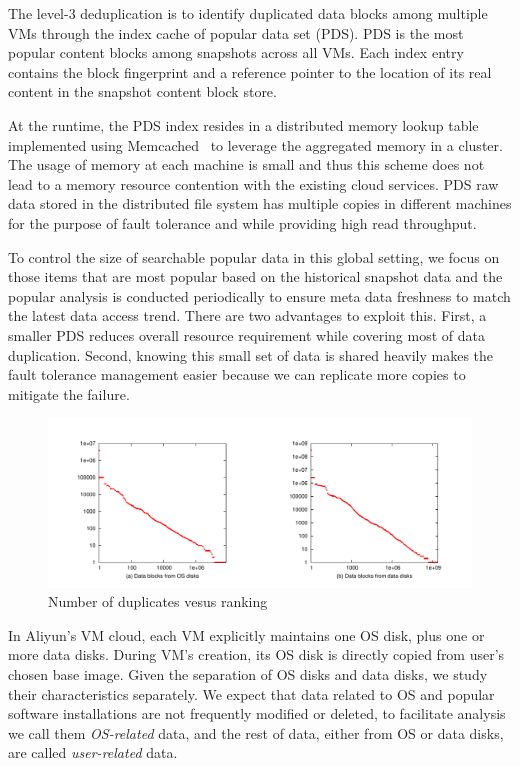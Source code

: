 The level-3 deduplication is to identify duplicated data blocks among multiple VMs through the index cache
of popular data set (PDS).  PDS is the most popular content blocks 
among snapshots across all VMs. 
Each index entry contains  the block fingerprint and a reference pointer to the location of its real content
in the snapshot content block store.

At the runtime, the PDS index resides in a distributed  memory lookup table  
implemented using Memcached~\cite{memcached} to leverage the aggregated memory in a cluster.
The usage of memory at each machine is small and thus  this scheme  does not
lead to  a memory resource contention with the existing cloud services.
PDS raw data stored  in the distributed file system
has multiple copies in different machines for the purpose of fault tolerance and 
while providing high read throughput.  

To control the size of searchable popular data in this global setting, we focus on those items that 
are most popular based on the historical snapshot data and the popular analysis is conducted periodically to ensure 
meta data freshness to match the latest data access trend.
There are two advantages to exploit this.
First, a smaller PDS reduces overall resource requirement while covering most of data duplication.
Second, knowing this small set of data is shared heavily makes the fault tolerance management 
easier because we can replicate more copies to mitigate the failure.

\begin{figure}[htbp]
\centering
\includegraphics[width=5in]{images/vector.pdf}
\caption{Number of duplicates vesus ranking}
\label{fig:zipf-data}
\end{figure}

In Aliyun's VM cloud, each VM explicitly maintains  one OS disk, plus one or more data disks.
During VM's creation, its OS disk is directly copied from user's chosen base image.
Given the separation of OS disks and data disks, we study  their characteristics separately.
We expect that data related to OS and popular software installations are not frequently
modified or deleted, to facilitate analysis we call them \emph{OS-related} data, 
and the rest of data, either from OS or data disks, are called \emph{user-related} data.

